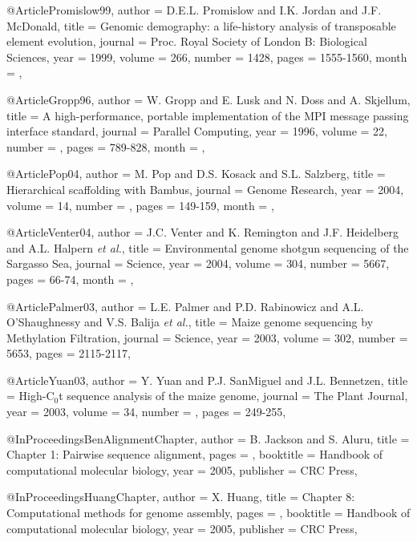 @Article{Promislow99,
  author =   {D.E.L. Promislow and I.K. Jordan and J.F. McDonald},
  title =    {Genomic demography: a life-history analysis of transposable element evolution},
  journal =  {Proc. Royal Society of London B: Biological Sciences},
  year =     {1999},
  volume =   {266},
  number =   {1428},
  pages =    {1555-1560},
  month =    {},
}

@Article{Gropp96,
  author =   {W. Gropp and E. Lusk and N. Doss and A. Skjellum},
  title =    {A high-performance, portable implementation of the {MPI} message passing interface standard},
  journal =  {Parallel Computing},
  year =     {1996},
  volume =   {22},
  number =   {},
  pages =    {789-828},
  month =    {},
}



@Article{Pop04,
  author =   {M. Pop and D.S. Kosack and S.L. Salzberg},
  title =    {{Hierarchical scaffolding with Bambus}},
  journal =  {Genome Research},
  year =     {2004},
  volume =   {14},
  number =   {},
  pages =    {149-159},
  month =    {},
}

@Article{Venter04,
	author =    {J.C. Venter and K. Remington and J.F. Heidelberg and A.L. Halpern {\it et al.}},
  title =   {{Environmental genome shotgun sequencing of the Sargasso Sea}},
  journal =  {Science},
  year =     {2004},
  volume =   {304},
  number =   {5667},
  pages =    {66-74},
  month =    {},
}

@Article{Palmer03,
  author = {L.E. Palmer and P.D. Rabinowicz and A.L. O'Shaughnessy and V.S. Balija {\it et al.}},
  title =  {{Maize genome sequencing by Methylation Filtration}},
  journal = {Science},
  year = {2003},
  volume =  {302},
  number =  {5653},
  pages =   {2115-2117},
}


@Article{Yuan03,
  author = {Y. Yuan and P.J. SanMiguel and J.L. Bennetzen},
  title =  {{High-C$_0$t sequence analysis of the maize genome}},
  journal = {The Plant Journal},
  year = {2003},
  volume =  {34},
  number =  {},
  pages =   {249-255},
}

@InProceedings{BenAlignmentChapter,
  author =       {B. Jackson and S. Aluru},
  title =  {{Chapter 1: Pairwise sequence alignment}},
  pages =        {},
  booktitle =    {Handbook of computational molecular biology},
  year =         {2005},
  publisher =    {CRC Press},
}


@InProceedings{HuangChapter,
  author =       {X. Huang},
  title =  {{Chapter 8: Computational methods for genome assembly}},
  pages =        {},
  booktitle =    {Handbook of computational molecular biology},
  year =         {2005},
  publisher =    {CRC Press},
}

